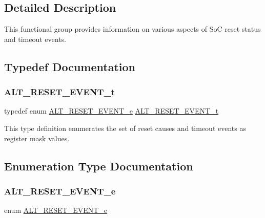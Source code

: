 \subsection{Detailed Description}
This functional group provides information on various aspects of SoC reset status and timeout events. 

\subsection{Typedef Documentation}
\mbox{\label{group__RST__MGR__STATUS_ga102726c685d2fd0c3cf94ae652977931}} 
\subsubsection{\texorpdfstring{ALT\_RESET\_EVENT\_t}{ALT\_RESET\_EVENT\_t}}
{\footnotesize\ttfamily typedef enum \mbox{\hyperlink{group__RST__MGR__STATUS_gaec1a3a92fb6ca1987fb805679ebae4ef}{A\+L\+T\+\_\+\+R\+E\+S\+E\+T\+\_\+\+E\+V\+E\+N\+T\+\_\+e}}  \mbox{\hyperlink{group__RST__MGR__STATUS_ga102726c685d2fd0c3cf94ae652977931}{A\+L\+T\+\_\+\+R\+E\+S\+E\+T\+\_\+\+E\+V\+E\+N\+T\+\_\+t}}}

This type definition enumerates the set of reset causes and timeout events as register mask values. 

\subsection{Enumeration Type Documentation}
\mbox{\label{group__RST__MGR__STATUS_gaec1a3a92fb6ca1987fb805679ebae4ef}} 
\subsubsection{\texorpdfstring{ALT\_RESET\_EVENT\_e}{ALT\_RESET\_EVENT\_e}}
{\footnotesize\ttfamily enum \mbox{\hyperlink{group__RST__MGR__STATUS_gaec1a3a92fb6ca1987fb805679ebae4ef}{A\+L\+T\+\_\+\+R\+E\+S\+E\+T\+\_\+\+E\+V\+E\+N\+T\+\_\+e}}}

